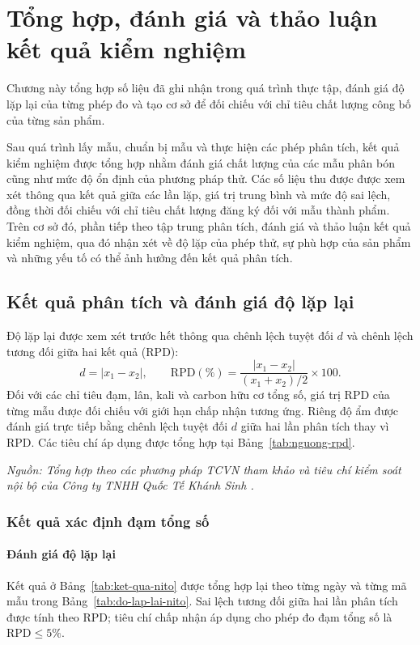 \chapter{Tổng hợp, đánh giá và thảo luận kết quả kiểm nghiệm}
Chương này tổng hợp số liệu đã ghi nhận trong quá trình thực tập, đánh giá độ lặp lại của từng phép đo và tạo cơ sở để đối chiếu với chỉ tiêu chất lượng công bố của từng sản phẩm.

Sau quá trình lấy mẫu, chuẩn bị mẫu và thực hiện các phép phân tích, kết quả kiểm nghiệm được tổng hợp nhằm đánh giá chất lượng của các mẫu phân bón cũng như mức độ ổn định của phương pháp thử. Các số liệu thu được được xem xét thông qua kết quả giữa các lần lặp, giá trị trung bình và mức độ sai lệch, đồng thời đối chiếu với chỉ tiêu chất lượng đăng ký đối với mẫu thành phẩm. Trên cơ sở đó, phần tiếp theo tập trung phân tích, đánh giá và thảo luận kết quả kiểm nghiệm, qua đó nhận xét về độ lặp của phép thử, sự phù hợp của sản phẩm và những yếu tố có thể ảnh hưởng đến kết quả phân tích.

\section{Kết quả phân tích và đánh giá độ lặp lại}
Độ lặp lại được xem xét trước hết thông qua chênh lệch tuyệt đối $d$ và chênh lệch tương đối giữa hai kết quả (RPD):
\[
  d=\left|x_1-x_2\right|, \qquad
  \mathrm{RPD}(\%)=\frac{\left|x_1-x_2\right|}{\left(x_1+x_2\right)/2}\times100.
\]
Đối với các chỉ tiêu đạm, lân, kali và carbon hữu cơ tổng số, giá trị RPD của từng mẫu được đối chiếu với giới hạn chấp nhận tương ứng. Riêng độ ẩm được đánh giá trực tiếp bằng chênh lệch tuyệt đối $d$ giữa hai lần phân tích thay vì RPD. Các tiêu chí áp dụng được tổng hợp tại Bảng~\ref{tab:nguong-rpd}.



\noindent\textit{Nguồn: Tổng hợp theo các phương pháp TCVN tham khảo và tiêu chí kiểm soát nội bộ của Công ty TNHH Quốc Tế Khánh Sinh \cite{company-internal-documents}.}

\subsection{Kết quả xác định đạm tổng số}
\NitrogenResultsTable

\subsubsection{Đánh giá độ lặp lại}
Kết quả ở Bảng~\ref{tab:ket-qua-nito} được tổng hợp lại theo từng ngày và từng mã mẫu trong Bảng~\ref{tab:do-lap-lai-nito}. Sai lệch tương đối giữa hai lần phân tích được tính theo RPD; tiêu chí chấp nhận áp dụng cho phép đo đạm tổng số là $\mathrm{RPD}\leq5\%$.

